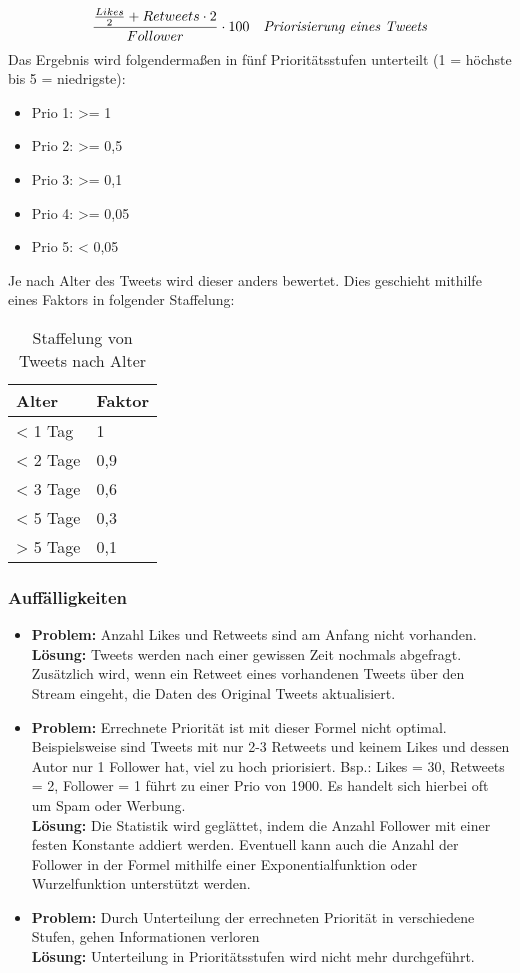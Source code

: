 \begin{equation}
\frac{\frac{Likes}{2} + Retweets \cdot 2}{Follower} \cdot 100
\quad
\text{\textit{Priorisierung eines Tweets}}
\end{equation}
Das Ergebnis wird folgendermaßen in fünf Prioritätsstufen unterteilt (1 = höchste bis 5 = 
niedrigste):
\begin{itemize}
  \item Prio 1: >= 1
  \item Prio 2: >= 0,5
  \item Prio 3: >= 0,1
  \item Prio 4: >= 0,05
  \item Prio 5: < 0,05 
\end{itemize}
Je nach Alter  des Tweets wird dieser anders bewertet. Dies geschieht mithilfe eines  
Faktors in folgender Staffelung: 
\begin{table}[!hb]
\centering
  \begin{tabular}{ll}
  \toprule
    \textbf{Alter} & \textbf{Faktor}  \\
    \hline
    < 1 Tag & 1 \\
    < 2 Tage & 0,9 \\
    < 3 Tage & 0,6 \\
    < 5 Tage & 0,3 \\
    > 5 Tage & 0,1 \\
    \bottomrule
  \end{tabular}
  \caption{Staffelung von Tweets nach Alter}
\end{table}
\subsubsection*{Auffälligkeiten}
\begin{itemize}
	\item \textbf{Problem:} Anzahl Likes und Retweets sind am Anfang nicht vorhanden. \\ \textbf{Lösung:} Tweets werden nach einer gewissen Zeit nochmals abgefragt. Zusätzlich wird, wenn ein Retweet eines vorhandenen Tweets über den Stream eingeht, die Daten des Original Tweets aktualisiert. 
	\item \textbf{Problem:} Errechnete Priorität ist mit dieser Formel nicht optimal. Beispielsweise sind Tweets mit nur 2-3 Retweets und keinem Likes und dessen Autor nur 1 Follower hat, viel zu hoch priorisiert. Bsp.: Likes = 30, Retweets = 2, Follower = 1 führt zu einer Prio von 1900. Es handelt sich hierbei oft um Spam oder Werbung. \\ \textbf{Lösung:} Die Statistik wird geglättet, indem die Anzahl Follower mit einer festen Konstante addiert werden. Eventuell kann auch die Anzahl der Follower in der Formel mithilfe einer Exponentialfunktion oder Wurzelfunktion unterstützt werden. 
	\item \textbf{Problem:} Durch Unterteilung der errechneten Priorität in verschiedene Stufen, gehen Informationen verloren \\ \textbf{Lösung:} Unterteilung in Prioritätsstufen wird nicht mehr durchgeführt.
\end{itemize}
    
